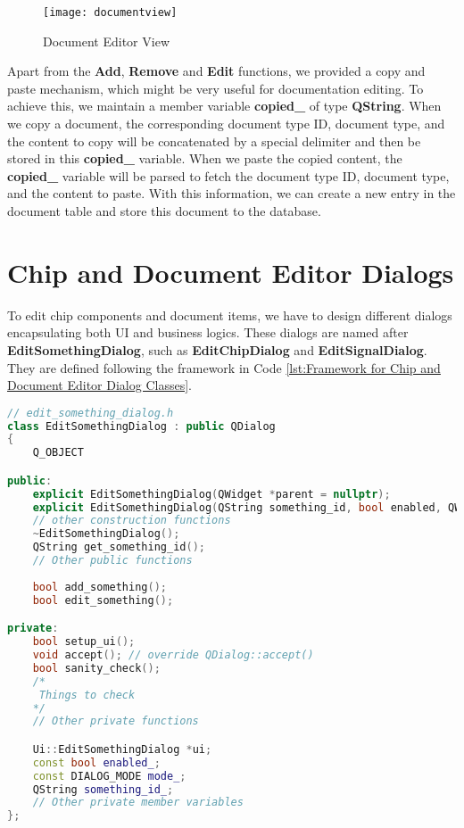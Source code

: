 \begin{figure}[htb]
\centering
\texttt{[image: documentview]}
\caption{Document Editor View\label{fig:Document Editor View}}
\end{figure}

Apart from the \textbf{Add}, \textbf{Remove} and \textbf{Edit} functions, we provided a copy and paste mechanism, which might be very useful for documentation editing. To achieve this, we maintain a member variable \textbf{copied\_} of type \textbf{QString}. When we copy a document, the corresponding document type ID, document type, and the content to copy will be concatenated by a special delimiter and then be stored in this \textbf{copied\_} variable. When we paste the copied content, the \textbf{copied\_} variable will be parsed to fetch the document type ID, document type, and the content to paste. With this information, we can create a new entry in the document table and store this document to the database.

\section{Chip and Document Editor Dialogs\label{sec:Chip and Document Editor Dialogs}}
To edit chip components and document items, we have to design different dialogs encapsulating both UI and business logics. These dialogs are named after \textbf{EditSomethingDialog}, such as \textbf{EditChipDialog} and \textbf{EditSignalDialog}. They are defined following the framework in Code \ref{lst:Framework for Chip and Document Editor Dialog Classes}.

\begin{lstlisting}[language=C++, caption={Framework for Chip and Document Editor Dialog Classes\label{lst:Framework for Chip and Document Editor Dialog Classes}}]
// edit_something_dialog.h
class EditSomethingDialog : public QDialog
{
    Q_OBJECT

public:
    explicit EditSomethingDialog(QWidget *parent = nullptr);
    explicit EditSomethingDialog(QString something_id, bool enabled, QWidget *parent = nullptr);
    // other construction functions
    ~EditSomethingDialog();
    QString get_something_id();
    // Other public functions
    
    bool add_something();
    bool edit_something();

private:
    bool setup_ui();
    void accept(); // override QDialog::accept()
    bool sanity_check();
    /*
     Things to check
    */
    // Other private functions

    Ui::EditSomethingDialog *ui;
    const bool enabled_;
    const DIALOG_MODE mode_;
    QString something_id_;
    // Other private member variables 
};
\end{lstlisting}

